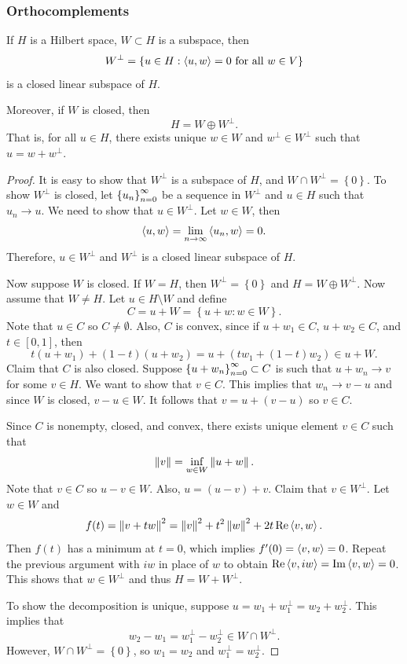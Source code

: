 \documentclass[a4paper]{article}
\begin{document}
\subsubsection*{Orthocomplements}
\begin{thm}
If $H$ is a Hilbert space, $W \subset H$ is a subspace,
then 
\[
W^\perp = \left\{ u \in H : \left\langle u, w \right\rangle = 0 
\text{ for all } w \in V \right\}
\]
is a closed linear subspace of $H$. 

Moreover, if $W$ is closed, then 
\[
H = W \oplus W^\perp.
\]
That is, for all $u \in H$, there exists
unique $w \in W$ and $w^\perp \in W^\perp$ such that 
$u = w + w^\perp$.
\end{thm}

\begin{proof}
It is easy to show that $W^\perp$ is a subspace of $H$,
and $W \cap W^\perp = \left\{ 0 \right\}$. 
To show $W^\perp$ is closed, let $\left\{ u_n \right\}_{n=0}^\infty$
be a sequence in $W^\perp$ and $u \in H$ such that 
$u_n \to u$. We need to show that $u \in W^\perp$. 
Let $w \in W$, then 
\[
\left\langle u, w \right\rangle = \lim_{n \to \infty} \left\langle u_n, w \right\rangle 
= 0.
\]
Therefore, $u \in W^\perp$ and $W^\perp$ is a closed 
linear subspace of $H$.

Now suppose $W$ is closed. If $W = H$, then 
$W^\perp = \left\{ 0 \right\}$ and $H = W \oplus W^\perp$. 
Now assume that $W \neq H$. Let $u \in H \setminus W$
and define
\[
C = u + W = \left\{ u + w : w \in W \right\}.
\]
Note that $u \in C$ so $C \neq \emptyset$. Also, 
$C$ is convex, since if $u + w_1 \in C$,
$u + w_2 \in C$, and $t \in [0, 1]$, then 
\[
t(u + w_1) + (1 - t)(u + w_2) = 
u + (t w_1 + (1-t) w_2) \in u + W.
\]
Claim that $C$ is also closed. Suppose $\left\{ u + w_n \right\}_{n=0}^\infty
\subset C$ is such that $u + w_n \to v$ for some 
$v \in H$. We want to show that $v \in C$. This implies that 
$w_n \to v - u$ and since $W$ is closed, $v - u \in W$. 
It follows that $v = u + (v - u)$ so $v \in C$. 

Since $C$ is nonempty, closed, and convex, there exists 
unique element $v \in C$ such that 
\[
  \left\lVert v\right\rVert = \inf_{w \in W} \left\lVert u + w\right\rVert.
\]
Note that $v \in C$ so $u - v \in W$. Also, 
$u = (u - v) + v$. Claim that $v \in W^\perp$.
Let $w \in W$ and 
\[
  f(t) = \left\lVert v + t w\right\rVert^2 = 
  \left\lVert v\right\rVert^2 + t^2 \left\lVert w\right\rVert^2 + 2 t \operatorname{Re} \left\langle v, w \right\rangle.
\]
Then $f(t)$ has a minimum at $t = 0$, which implies 
$f'(0) = \left\langle v, w \right\rangle = 0$. Repeat the previous 
argument with $iw$ in place of $w$ to obtain 
$\operatorname{Re} \left\langle v, iw \right\rangle = \operatorname{Im} \left\langle v, w \right\rangle = 0$. 
This shows that $w \in W^\perp$ and thus
$H = W + W^\perp$.

To show the decomposition is unique, suppose 
$u = w_1 + w_1^\perp = w_2 + w_2^\perp$. This implies 
that 
\[
  w_2 - w_1 = w_1^\perp - w_2^\perp \in W \cap W^\perp.
\]
However, $W \cap W^\perp = \left\{ 0 \right\}$, so 
$w_1 = w_2$ and $w_1^\perp = w_2^\perp$.
\end{proof}
\end{document}
